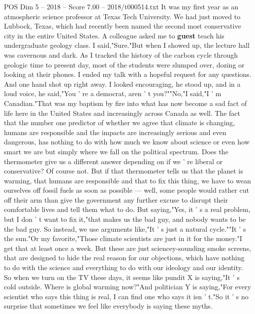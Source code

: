\begin{textsample}{POS Dim 5 – 2018 – Score 7.00 – 2018/t000514.txt}  \label{ex:f5_pos_064}
It was my first year as an atmospheric science professor at Texas Tech University.
We had just moved to Lubbock, Texas, which had recently been named the second most conservative city in the entire United States.
A colleague asked me to \textbf{guest} teach his undergraduate geology class.
I said,"Sure."But when I showed up, the lecture hall was cavernous and dark.
As I tracked the history of the carbon cycle through geologic time to present day, most of the students were slumped over, dozing or looking at their phones.
I ended my talk with a hopeful request for any questions.
And one hand shot up right away.
I looked encouraging, he stood up, and in a loud voice, he said,"You ' re a democrat, aren ' t you?""No,"I said,"I ' m Canadian."That was my baptism by fire into what has now become a sad fact of life here in the United States and increasingly across Canada as well.
The fact that the number one predictor of whether we agree that climate is changing, humans are responsible and the impacts are increasingly serious and even dangerous, has nothing to do with how much we know about science or even how smart we are but simply where we fall on the political spectrum.
Does the thermometer give us a different answer depending on if we ' re liberal or conservative?
Of course not.
But if that thermometer tells us that the planet is warming, that humans are responsible and that to fix this thing, we have to wean ourselves off fossil fuels as soon as possible — well, some people would rather cut off their arm than give the government any further excuse to disrupt their comfortable lives and tell them what to do.
But saying,"Yes, it ' s a real problem, but I don ' t want to fix it,"that makes us the bad guy, and nobody wants to be the bad guy.
So instead, we use arguments like,"It ' s just a natural cycle.""It ' s the sun."Or my favorite,"Those climate scientists are just in it for the money."I get that at least once a week.
But these are just sciencey-sounding smoke screens, that are designed to hide the real reason for our objections, which have nothing to do with the science and everything to do with our ideology and our identity.
So when we turn on the TV these days, it seems like pundit X is saying,"It ' s cold outside.
Where is global warming now?"And politician Y is saying,"For every scientist who says this thing is real, I can find one who says it isn ' t."So it ' s no surprise that sometimes we feel like everybody is saying these myths.

\end{textsample}
